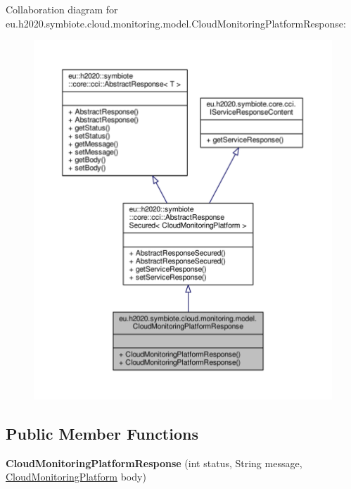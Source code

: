 Collaboration diagram for eu.\+h2020.\+symbiote.\+cloud.\+monitoring.\+model.\+Cloud\+Monitoring\+Platform\+Response\+:\nopagebreak
\begin{figure}[H]
\begin{center}
\leavevmode
\includegraphics[width=350pt]{classeu_1_1h2020_1_1symbiote_1_1cloud_1_1monitoring_1_1model_1_1CloudMonitoringPlatformResponse__coll__graph}
\end{center}
\end{figure}
\subsection*{Public Member Functions}
\begin{DoxyCompactItemize}
\item 
\mbox{\label{classeu_1_1h2020_1_1symbiote_1_1cloud_1_1monitoring_1_1model_1_1CloudMonitoringPlatformResponse_a6f1c57c0b68a9ad6740a07b8e259f583}} 
{\bfseries Cloud\+Monitoring\+Platform\+Response} (int status, String message, \hyperlink{classeu_1_1h2020_1_1symbiote_1_1cloud_1_1monitoring_1_1model_1_1CloudMonitoringPlatform}{Cloud\+Monitoring\+Platform} body)
\end{DoxyCompactItemize}


